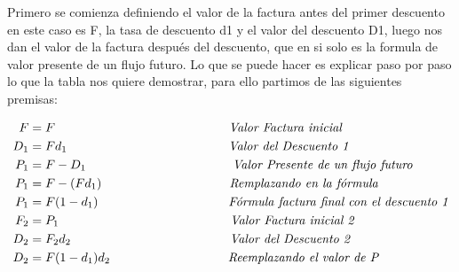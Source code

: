 \begin{spacing}{1.5}
 Primero se comienza definiendo el valor de la factura antes del primer descuento en este caso es F, la tasa de descuento d1 y el valor del descuento D1, luego nos dan el valor de la factura después del descuento, que en si solo es la formula de valor presente de un flujo futuro.
 \newline
 Lo que se puede hacer es explicar paso por paso lo que la tabla nos quiere demostrar, para ello partimos de las siguientes premisas:
 \clearpage
 \begin{center}
  \begin{align*}
   F     & = F \hspace{140 pt}\textit{Valor Factura inicial}                              \\
   D_1   & = Fd_{1}\hspace{130 pt} \textit{Valor del Descuento 1 }                        \\
   P_1   & = F-D_{1}\hspace{118 pt} \textit{Valor Presente de un flujo futuro}            \\
   P_1   & = F-(Fd_{1})\hspace{103 pt} \textit{Remplazando en la fórmula}                 \\
   P_1   & = F(1-d_{1})\hspace{105 pt}\textit{Fórmula factura final con el descuento 1}   \\
   \newline
   F_{2} & = P_{1} \hspace{138 pt}\textit{Valor Factura inicial 2}                        \\
   D_{2} & = F_{2}d_{2}\hspace{128 pt} \textit{Valor del Descuento 2 }                    \\
   D_{2} & = F(1-d_{1})d_{2}\hspace{95 pt} \textit{Reemplazando el valor de P }           \\

\end{align*}
\end{center}
\end{spacing}
